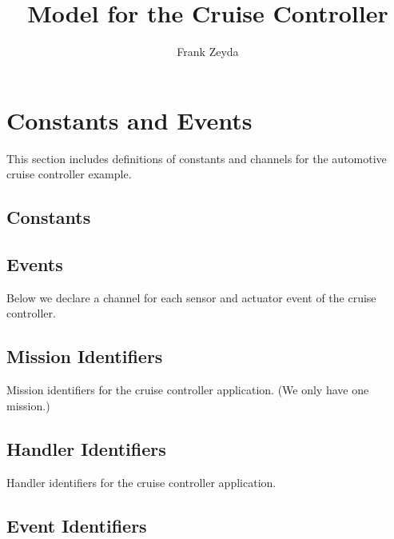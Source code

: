 \documentclass{article}
\title{{\Circus} Model for the Cruise Controller}
\author{Frank Zeyda}
\begin{document}
\maketitle

\tableofcontents

\newpage

\section{Constants and Events}

This section includes definitions of constants and channels for the automotive cruise controller example.

\subsection{Constants}



\subsection{Events}

Below we declare a channel for each sensor and actuator event of the cruise controller.
%


\subsection{Mission Identifiers}

Mission identifiers for the cruise controller application. (We only have one mission.)

\begin{circusbox}

\end{circusbox}

\subsection{Handler Identifiers}

Handler identifiers for the cruise controller application.

\begin{circusbox}

\end{circusbox}

\subsection{Event Identifiers}
\end{document}
